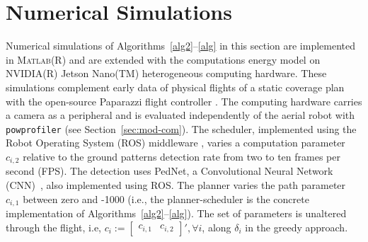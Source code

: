 \documentclass[letterpaper,10pt,journal,twoside]{IEEEtran}
\newcommand{\stt}[1]{{\small\tt #1}} %
\newcommand{\powprof}{\stt{powprofiler}}
\newcommand{\figpath}{./figures}
\theoremstyle{definition}
\begin{document}
\begin{figure*}
  \centering
  \footnotesize
  
  \vspace*{-.6ex}
  \caption{\color{blue}
  Planning-scheduling of CPP and ground patterns detections%
  , utilizing the lowest configuration \hyperref[fig:trajs-I-static]{I} as a starting point in \hyperref[fig:trajs-dyn-i]{i} and the highest \hyperref[fig:trajs-II-static]{II} in \hyperref[fig:trajs-dyn-ii]{ii} while varying atmospheric (same as Fig.~\ref{fig:stat}) and battery conditions. In \hyperref[fig:dyn]{a} are the re-planned trajectories, in \hyperref[fig:dyn]{b} the parameters, and in \hyperref[fig:dyn]{c} the energy w.r.t. the battery.
  }
  \label{fig:dyn}
  \vspace*{-4ex}
\end{figure*}


\vspace*{-1.4ex}
\section{Numerical Simulations} %
\label{sec:experimental}        %
\vspace*{-.2ex}

Numerical simulations of Algorithms~\ref{alg2}--\ref{alg} in this section are implemented in \textsc{Matlab}\hspace{.5ex}(R) and are extended with the computations energy model on NVIDIA\hspace{.5ex}(R) Jetson Nano\hspace{.5ex}(TM) heterogeneous computing hardware. These simulations complement early data of physical flights of a static coverage plan with the open-source Paparazzi flight controller%
.
The computing hardware carries a camera as a peripheral and is evaluated independently of the aerial robot with \powprof{} (see Section~\ref{sec:mod-com}). The scheduler, implemented using the Robot Operating System (ROS) middleware%
, varies a computation parameter $c_{i,2}$ relative to the ground patterns detection rate from two to ten frames per second (FPS). The detection uses PedNet, a Convolutional Neural Network (CNN)~\cite{ullah2018pednet}, also implemented using ROS. The planner varies the path parameter $c_{i,1}$ %
between zero and -1000 (i.e., the planner-scheduler is the concrete implementation of Algorithms~\ref{alg2}--\ref{alg}). The set of parameters is unaltered through the flight, i.e, $c_i:=\begin{bmatrix}c_{i,1}&c_{i,2}\end{bmatrix}',\forall i${\color{blue}, along $\delta_i$ %
in the greedy approach}. 
\end{document}
